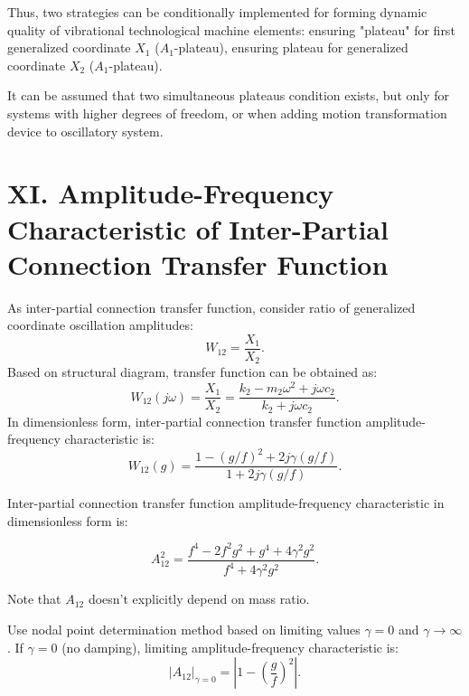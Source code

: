 \documentclass[12pt, a4paper]{article}
\begin{document}
	Thus, two strategies can be conditionally implemented for forming dynamic quality of vibrational technological machine elements: ensuring "plateau" for first generalized coordinate $X_1$ ($A_1$-plateau), ensuring plateau for generalized coordinate $X_2$ ($A_1$-plateau).
	
	It can be assumed that two simultaneous plateaus condition exists, but only for systems with higher degrees of freedom, or when adding motion transformation device to oscillatory system.
	
	\section*{XI. Amplitude-Frequency Characteristic of Inter-Partial Connection Transfer Function}
	
	As inter-partial connection transfer function, consider ratio of generalized coordinate oscillation amplitudes:
	\begin{equation}
		W_{12} = \frac{X_1}{X_2}.
	\end{equation}
	Based on structural diagram, transfer function can be obtained as: 	
	\begin{equation}
		W_{12}(j\omega) = \frac{X_1}{X_2} = \frac{k_2 - m_2\omega^2 + j\omega c_2}{k_2 + j\omega c_2}.
	\end{equation}
	In dimensionless form, inter-partial connection transfer function amplitude-frequency characteristic is:
	\begin{equation}
		W_{12}(g) = \frac{1 - (g/f)^2 + 2 j\gamma(g/f)}{1 +2 j\gamma(g/f)}.
		\label{eq:W12}
	\end{equation}
	
	Inter-partial connection transfer function amplitude-frequency characteristic in dimensionless form is:
	
	\begin{equation}
		A_{12}^{2} = 
		\frac{f^{4}-2 f^{2} g^{2}+g^{4}+4 \gamma^{2} g^{2}}{f^{4}+4 \gamma^{2} g^{2}}.
	\end{equation}
	
	Note that $A_{12}$ doesn't explicitly depend on mass ratio. 
	
	Use nodal point determination method based on limiting values $\gamma = 0$ and $\gamma \to \infty$. If $\gamma = 0$ (no damping), limiting amplitude-frequency characteristic is:
	\begin{equation}
		|A_{12}|_{\gamma=0} = \left|1 - \left(\frac{g}{f}\right)^2\right|.
		\label{eq:A12_gamma0}
	\end{equation}
	
\end{document}
